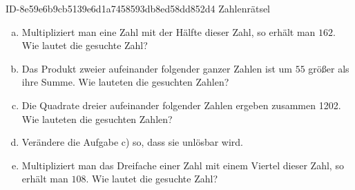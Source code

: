 \begin{exercise}
      {ID-8e59e6b9cb5139e6d1a7458593db8ed58dd852d4}
      {Zahlenrätsel}
  \ifproblem\problem
    \begin{enumerate}[a)]
      \item Multipliziert man eine Zahl mit der Hälfte dieser Zahl, so erhält man
            $162$. Wie lautet die gesuchte Zahl?
      \item Das Produkt zweier aufeinander folgender ganzer Zahlen ist um $55$ größer
            als ihre Summe. Wie lauteten die gesuchten Zahlen?
      \item Die Quadrate dreier aufeinander folgender Zahlen ergeben zusammen
            \num{1202}. Wie lauteten die gesuchten Zahlen?
      \item Verändere die Aufgabe c) so, dass sie unlösbar wird.
      \item Multipliziert man das Dreifache einer Zahl mit einem Viertel dieser
            Zahl, so erhält man $108$. Wie lautet die gesuchte Zahl?
    \end{enumerate}
  \fi
\end{exercise}
